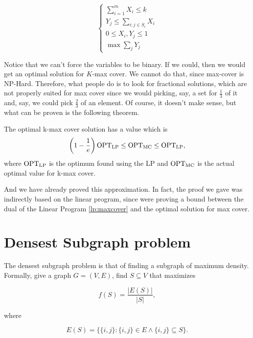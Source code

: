 \begin{equation}\label{lp:maxcover}
\begin{cases}
\sum_{i=1}^m X_i \leq k\\
Y_j \leq \sum_{i: j\in S_i} X_i\\
0 \leq X_i, Y_j \leq 1\\
\max \sum_j Y_j
\end{cases}
\end{equation}

Notice that we can't force the variables to be binary. If we could, then we would get an optimal solution for $K$-max cover. We cannot do that, since max-cover is NP-Hard.  Therefore, what people do is to look for fractional solutions, which are not properly suited for max cover since we would picking, say, a set for $\frac{1}{3}$ of it and, say, we could pick $\frac{2}{3}$ of an element. Of course, it  doesn't make sense, but what can be proven is the following theorem.
\begin{thm}
The optimal k-max cover solution has a value which is
\begin{equation}
\left(1 - \frac{1}{e}\right)\text{OPT}_{\text{LP}} \leq \text{OPT}_{\text{MC}} \leq \text{OPT}_{\text{LP}},
\end{equation}
where $\text{OPT}_{\text{LP}}$ is the optimum found using the LP and $\text{OPT}_{\text{MC}}$ is the actual optimal value for k-max cover.
\end{thm}

And we have already proved this approximation. In fact, the proof we gave was indirectly based on the linear program, since were proving a bound between the dual of the Linear Program \ref{lp:maxcover} and the optimal solution for max cover. 

\section{Densest Subgraph problem}

The densest subgraph problem is that of finding a subgraph of maximum density. Formally, give a graph $G = (V, E)$, find $S\subseteq V$ that maximizes

\begin{equation}
f(S) = \frac{|E(S)|}{|S|},
\end{equation}

where

\begin{equation}
E(S) = \{ \{i, j\} : \{i, j\} \in E \wedge \{i, j\} \subseteq S \}.
\end{equation}

